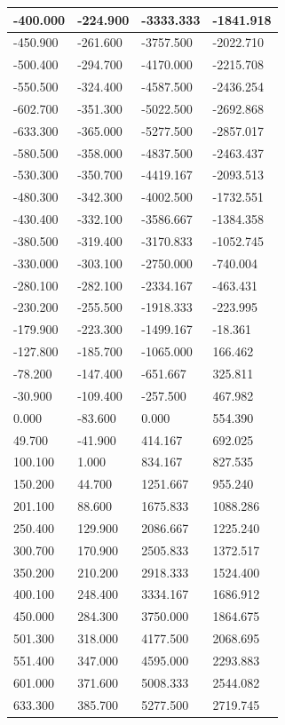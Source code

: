 \documentclass[zihao=5, UTF8]{article}
\theoremstyle{MyLineTheoremStyle} %
\theoremstyle{MyBlockTheoremStyle} %
\theoremstyle{MySubsubsectionStyle} %
\begin{document}
\begin{longtable}{|p{}|p{}|p{}|p{}|}
  \hline
  -400.000 & -224.900 & -3333.333 & -1841.918 \\
  \hline
  -450.900 & -261.600 & -3757.500 & -2022.710 \\
  \hline
  -500.400 & -294.700 & -4170.000 & -2215.708 \\
  \hline
  -550.500 & -324.400 & -4587.500 & -2436.254 \\
  \hline
  -602.700 & -351.300 & -5022.500 & -2692.868 \\
  \hline
  -633.300 & -365.000 & -5277.500 & -2857.017 \\
  \hline
  -580.500 & -358.000 & -4837.500 & -2463.437 \\
  \hline
  -530.300 & -350.700 & -4419.167 & -2093.513 \\
  \hline
  -480.300 & -342.300 & -4002.500 & -1732.551 \\
  \hline
  -430.400 & -332.100 & -3586.667 & -1384.358 \\
  \hline
  -380.500 & -319.400 & -3170.833 & -1052.745 \\
  \hline
  -330.000 & -303.100 & -2750.000 & -740.004 \\
  \hline
  -280.100 & -282.100 & -2334.167 & -463.431 \\
  \hline
  -230.200 & -255.500 & -1918.333 & -223.995 \\
  \hline
  -179.900 & -223.300 & -1499.167 & -18.361 \\
  \hline
  -127.800 & -185.700 & -1065.000 & 166.462 \\
  \hline
  -78.200  & -147.400 & -651.667  & 325.811 \\
  \hline
  -30.900  & -109.400 & -257.500  & 467.982 \\
  \hline
  0.000    & -83.600  & 0.000     & 554.390 \\
  \hline
  49.700   & -41.900  & 414.167   & 692.025 \\
  \hline
  100.100  & 1.000    & 834.167   & 827.535 \\
  \hline
  150.200  & 44.700   & 1251.667  & 955.240 \\
  \hline
  201.100  & 88.600   & 1675.833  & 1088.286 \\
  \hline
  250.400  & 129.900  & 2086.667  & 1225.240 \\
  \hline
  300.700  & 170.900  & 2505.833  & 1372.517 \\
  \hline
  350.200  & 210.200  & 2918.333  & 1524.400 \\
  \hline
  400.100  & 248.400  & 3334.167  & 1686.912 \\
  \hline
  450.000  & 284.300  & 3750.000  & 1864.675 \\
  \hline
  501.300  & 318.000  & 4177.500  & 2068.695 \\
  \hline
  551.400  & 347.000  & 4595.000  & 2293.883 \\
  \hline
  601.000  & 371.600  & 5008.333  & 2544.082 \\
  \hline
  633.300  & 385.700  & 5277.500  & 2719.745 \\
  \hline
\end{longtable}
\end{document}
